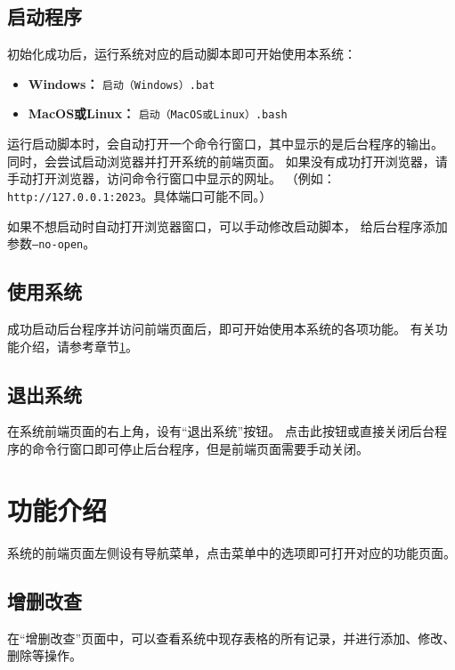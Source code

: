 \documentclass[12pt,titlepage]{article}
\begin{document}
\subsection{启动程序}

初始化成功后，运行系统对应的启动脚本即可开始使用本系统：

\begin{itemize}
    \item \textbf{Windows：} \texttt{启动（Windows）.bat}
    \item \textbf{MacOS或Linux：} \texttt{启动（MacOS或Linux）.bash}
\end{itemize}

运行启动脚本时，会自动打开一个命令行窗口，其中显示的是后台程序的输出。
同时，会尝试启动浏览器并打开系统的前端页面。
如果没有成功打开浏览器，请手动打开浏览器，访问命令行窗口中显示的网址。
（例如：\nolinkurl{http://127.0.0.1:2023}。具体端口可能不同。）

如果不想启动时自动打开浏览器窗口，可以手动修改启动脚本，
给后台程序添加参数\texttt{--no-open}。

\subsection{使用系统}

成功启动后台程序并访问前端页面后，即可开始使用本系统的各项功能。
有关功能介绍，请参考章节\ref{sec:functionalities}。

\subsection{退出系统}

在系统前端页面的右上角，设有“退出系统”按钮。
点击此按钮或直接关闭后台程序的命令行窗口即可停止后台程序，但是前端页面需要手动关闭。

\newpage
\section{功能介绍}
\label{sec:functionalities}

系统的前端页面左侧设有导航菜单，点击菜单中的选项即可打开对应的功能页面。

\subsection{增删改查}

在“增删改查”页面中，可以查看系统中现存表格的所有记录，并进行添加、修改、删除等操作。
\end{document}
